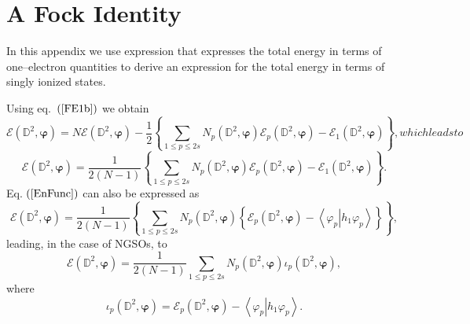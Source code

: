 \documentclass[aps,preprint]{revtex4}%
\begin{document}
\section{A Fock Identity\label{FockID}}

In this appendix we use expression that expresses the total energy in terms of
one--electron quantities to derive an expression for the total energy in terms
of singly ionized states.

Using eq.\ $\left(  \ref{FE1b}\right)  $ we obtain
\begin{subequations}
\begin{equation}
\mathcal{E}\left(  \mathbb{D}^{2},\mathbf{\varphi}\right)  =N\mathcal{E}%
\left(  \mathbb{D}^{2},\mathbf{\varphi}\right)  -\frac{1}{2}\left\{
\sum_{1\leq p\leq2s}N_{p}\left(  \mathbb{D}^{2},\mathbf{\varphi}\right)
\mathcal{E}_{p}\left(  \mathbb{D}^{2},\mathbf{\varphi}\right)  -\mathcal{E}%
_{1}\left(  \mathbb{D}^{2},\mathbf{\varphi}\right)  \right\}  ,
\end{equation}
which leads to
\end{subequations}
\begin{equation}
\mathcal{E}\left(  \mathbb{D}^{2},\mathbf{\varphi}\right)  =\frac{1}{2\left(
N-1\right)  }\left\{  \sum_{1\leq p\leq2s}N_{p}\left(  \mathbb{D}%
^{2},\mathbf{\varphi}\right)  \mathcal{E}_{p}\left(  \mathbb{D}^{2}%
,\mathbf{\varphi}\right)  -\mathcal{E}_{1}\left(  \mathbb{D}^{2}%
,\mathbf{\varphi}\right)  \right\}  . \label{EnFunc}%
\end{equation}
Eq. $\left(  \ref{EnFunc}\right)  $ can also be expressed as
\begin{equation}
\mathcal{E}\left(  \mathbb{D}^{2},\mathbf{\varphi}\right)  =\frac{1}{2\left(
N-1\right)  }\left\{  \sum_{1\leq p\leq2s}N_{p}\left(  \mathbb{D}%
^{2},\mathbf{\varphi}\right)  \left\{  \mathcal{E}_{p}\left(  \mathbb{D}%
^{2},\mathbf{\varphi}\right)  -\left\langle \left.  \varphi_{p}\right\vert
h_{1}\varphi_{p}\right\rangle \right\}  \right\}  , \label{EnFuncNew}%
\end{equation}
leading, in the case of NGSOs, to
\begin{equation}
\mathcal{E}\left(  \mathbb{D}^{2},\mathbf{\varphi}\right)  =\frac{1}{2\left(
N-1\right)  }\sum_{1\leq p\leq2s}N_{p}\left(  \mathbb{D}^{2},\mathbf{\varphi
}\right)  \iota_{p}\left(  \mathbb{D}^{2},\mathbf{\varphi}\right)  ,
\end{equation}
where
\begin{equation}
\iota_{p}\left(  \mathbb{D}^{2},\mathbf{\varphi}\right)  =\mathcal{E}%
_{p}\left(  \mathbb{D}^{2},\mathbf{\varphi}\right)  -\left\langle \left.
\varphi_{p}\right\vert h_{1}\varphi_{p}\right\rangle .
\end{equation}
\end{document}

